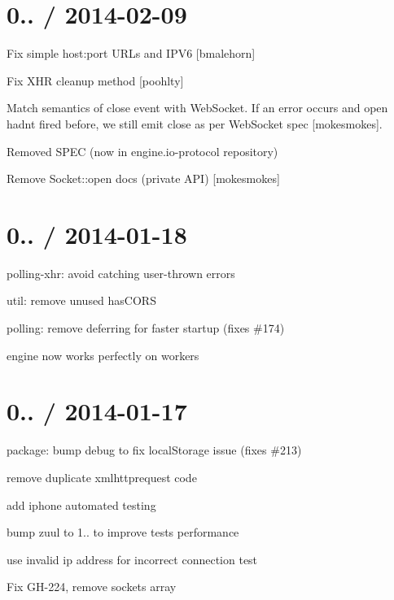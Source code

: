 \section*{0.. / 2014-\/02-\/09 }


\begin{DoxyItemize}
\item Fix simple {\ttfamily host\+:port} U\+R\+Ls and I\+P\+V6 \mbox{[}bmalehorn\mbox{]}
\item Fix X\+HR cleanup method \mbox{[}poohlty\mbox{]}
\item Match semantics of {\ttfamily close} event with {\ttfamily Web\+Socket}. If an error occurs and {\ttfamily open} hadn\textquotesingle{}t fired before, we still emit {\ttfamily close} as per Web\+Socket spec \mbox{[}mokesmokes\mbox{]}.
\item Removed S\+P\+EC (now in {\ttfamily engine.\+io-\/protocol} repository)
\item Remove {\ttfamily Socket\+::open} docs (private A\+PI) \mbox{[}mokesmokes\mbox{]}
\end{DoxyItemize}

\section*{0.. / 2014-\/01-\/18 }


\begin{DoxyItemize}
\item polling-\/xhr\+: avoid catching user-\/thrown errors
\item util\+: remove unused {\ttfamily has\+C\+O\+RS}
\item polling\+: remove deferring for faster startup (fixes \#174)
\item engine now works perfectly on workers
\end{DoxyItemize}

\section*{0.. / 2014-\/01-\/17 }


\begin{DoxyItemize}
\item package\+: bump debug to fix {\ttfamily local\+Storage} issue (fixes \#213)
\item remove duplicate xmlhttprequest code
\item add iphone automated testing
\item bump zuul to 1.. to improve tests performance
\item use invalid ip address for incorrect connection test
\item Fix G\+H-\/224, remove sockets array
\end{DoxyItemize}

